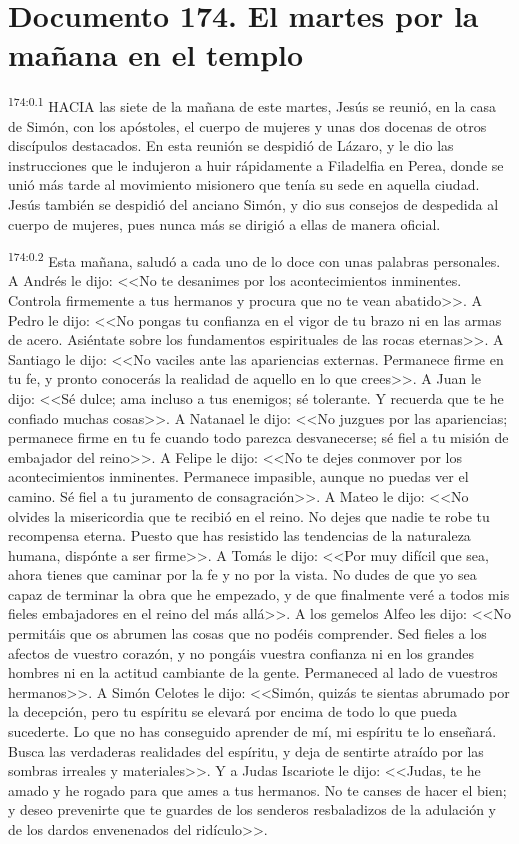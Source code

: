 \chapter{Documento 174. El martes por la mañana en el templo}
\par 
\textsuperscript{174:0.1} HACIA las siete de la mañana de este martes, Jesús se reunió, en la casa de Simón, con los apóstoles, el cuerpo de mujeres y unas dos docenas de otros discípulos destacados. En esta reunión se despidió de Lázaro, y le dio las instrucciones que le indujeron a huir rápidamente a Filadelfia en Perea, donde se unió más tarde al movimiento misionero que tenía su sede en aquella ciudad. Jesús también se despidió del anciano Simón, y dio sus consejos de despedida al cuerpo de mujeres, pues nunca más se dirigió a ellas de manera oficial.

\par 
\textsuperscript{174:0.2} Esta mañana, saludó a cada uno de lo doce con unas palabras personales. A Andrés le dijo: <<No te desanimes por los acontecimientos inminentes. Controla firmemente a tus hermanos y procura que no te vean abatido>>. A Pedro le dijo: <<No pongas tu confianza en el vigor de tu brazo ni en las armas de acero. Asiéntate sobre los fundamentos espirituales de las rocas eternas>>. A Santiago le dijo: <<No vaciles ante las apariencias externas. Permanece firme en tu fe, y pronto conocerás la realidad de aquello en lo que crees>>. A Juan le dijo: <<Sé dulce; ama incluso a tus enemigos; sé tolerante. Y recuerda que te he confiado muchas cosas>>. A Natanael le dijo: <<No juzgues por las apariencias; permanece firme en tu fe cuando todo parezca desvanecerse; sé fiel a tu misión de embajador del reino>>. A Felipe le dijo: <<No te dejes conmover por los acontecimientos inminentes. Permanece impasible, aunque no puedas ver el camino. Sé fiel a tu juramento de consagración>>. A Mateo le dijo: <<No olvides la misericordia que te recibió en el reino. No dejes que nadie te robe tu recompensa eterna. Puesto que has resistido las tendencias de la naturaleza humana, dispónte a ser firme>>. A Tomás le dijo: <<Por muy difícil que sea, ahora tienes que caminar por la fe y no por la vista. No dudes de que yo sea capaz de terminar la obra que he empezado, y de que finalmente veré a todos mis fieles embajadores en el reino del más allá>>. A los gemelos Alfeo les dijo: <<No permitáis que os abrumen las cosas que no podéis comprender. Sed fieles a los afectos de vuestro corazón, y no pongáis vuestra confianza ni en los grandes hombres ni en la actitud cambiante de la gente. Permaneced al lado de vuestros hermanos>>. A Simón Celotes le dijo: <<Simón, quizás te sientas abrumado por la decepción, pero tu espíritu se elevará por encima de todo lo que pueda sucederte. Lo que no has conseguido aprender de mí, mi espíritu te lo enseñará. Busca las verdaderas realidades del espíritu, y deja de sentirte atraído por las sombras irreales y materiales>>. Y a Judas Iscariote le dijo: <<Judas, te he amado y he rogado para que ames a tus hermanos. No te canses de hacer el bien; y deseo prevenirte que te guardes de los senderos resbaladizos de la adulación y de los dardos envenenados del ridículo>>.

